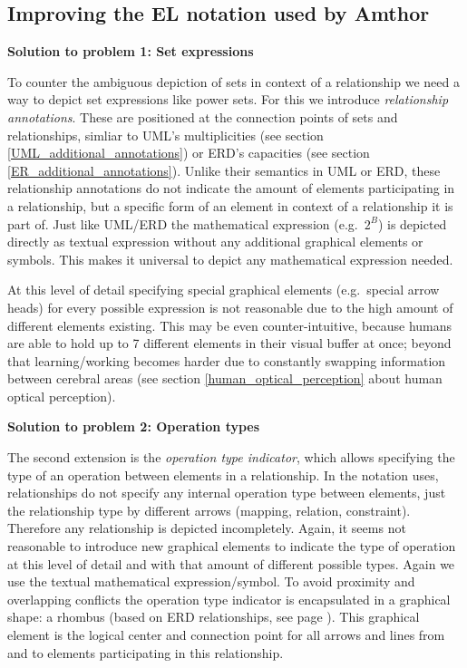\documentclass[twoside, openright, 12pt]{book}
\begin{document}
\vspace{10mm}

\subsection{Improving the EL notation used by Amthor}
\label{improving_notation}
\vspace{2mm}
\noindent
\textbf{Solution to problem 1: Set expressions}
\vspace{1mm}

\noindent
To counter the ambiguous depiction of sets in context of a relationship we need a way to depict set expressions like power sets.
For this we introduce \textit{relationship annotations}.
These are positioned at the connection points of sets and relationships, simliar to UML's multiplicities (see section \ref{UML_additional_annotations}) or ERD's capacities (see section \ref{ER_additional_annotations}).
Unlike their semantics in UML or ERD, these relationship annotations do not indicate the amount of elements participating in a relationship, but a specific form of an element in context of a relationship it is part of.
Just like UML/ERD the mathematical expression (e.g.~$2^B$) is depicted directly as textual expression without any additional graphical elements or symbols.
This makes it universal to depict any mathematical expression needed.

At this level of detail specifying special graphical elements (e.g.~special arrow heads) for every possible expression is not reasonable due to the high amount of different elements existing.
This may be even counter-intuitive, because humans are able to hold up to 7 different elements in their visual buffer at once; beyond that learning/working becomes harder due to constantly swapping information between cerebral areas (see section \ref{human_optical_perception} about human optical perception).

\vspace{2mm}
\noindent
\textbf{Solution to problem 2: Operation types}
\vspace{1mm}

\noindent
The second extension is the \textit{operation type indicator}, which allows specifying the type of an operation between elements in a relationship.
In the notation \cite{Amthor18} uses, relationships do not specify any internal operation type between elements, just the relationship type by different arrows (mapping, relation, constraint).
Therefore any relationship is depicted incompletely.
Again, it seems not reasonable to introduce new graphical elements to indicate the type of operation at this level of detail and with that amount of different possible types.
Again we use the textual mathematical expression/symbol.
To avoid proximity and overlapping conflicts the operation type indicator is encapsulated in a graphical shape: a rhombus (based on ERD relationships, see page \pageref{fig:ERD_relationship}).
This graphical element is the logical center and connection point for all arrows and lines from and to elements participating in this relationship.
\end{document}

